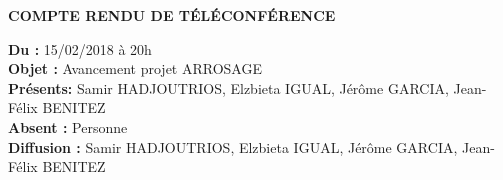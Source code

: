 \documentclass[11pt,a4paper,french,twoside,openright]{article}
\begin{document}
\pagestyle{fancy}

\begin{center}\bfseries\huge
COMPTE RENDU DE TÉLÉCONFÉRENCE %
\end{center}

\small
\noindent
\textbf{Du :} 15/02/2018 à 20h \\
\textbf{Objet :} Avancement projet ARROSAGE \\
\textbf{Présents:} Samir HADJOUTRIOS, Elzbieta IGUAL, Jérôme GARCIA, Jean-Félix BENITEZ \\
\textbf{Absent :} Personne \\
\textbf{Diffusion :} Samir HADJOUTRIOS, Elzbieta IGUAL, Jérôme GARCIA, Jean-Félix BENITEZ\\
\normalsize

\hrulefill
\end{document}
